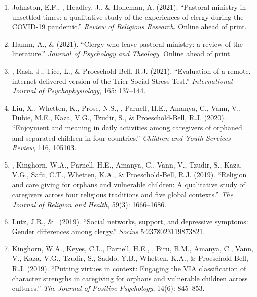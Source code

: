 \begin{enumerate}
\item Johnston, E.F., \Eagle, Headley, J., \& Holleman, A. (2021). ``Pastoral ministry in unsettled times: a qualitative study of the experiences of clergy during the COVID-19 pandemic.'' \textit{Review of Religious Research}. Online ahead of print. 

\item Hamm, A., \&  \Eagle \CF \hspace{.01em} (2021). ``Clergy who leave pastoral ministry: a review of the literature.'' \textit{Journal of Psychology and Theology}. Online ahead of print. 

\item \Eagle, Rash, J., Tice, L., \& Proeschold-Bell, R.J. (2021). ``Evaluation of a remote, internet-delivered version of the Trier Social Stress Test.'' \textit{International Journal of Psychophysiology}, 165: 137--144. 

\item Liu, X., Whetten, K., Prose, N.S., \Eagle, Parnell, H.E., Amanya, C., Vann, V., Dubie, M.E., Kaza, V.G., Tzudir, S., \& Proeschold-Bell, R.J. (2020). ``Enjoyment and meaning in daily activities among caregivers of orphaned and separated children in four countries.'' \emph{Children and Youth Services Review}, 116, 105103. 

\item \Eagle, Kinghorn, W.A., Parnell, H.E., Amanya, C., Vann, V., Tzudir, S., Kaza, V.G., Safu, C.T., Whetten, K.A., \& Proeschold-Bell, R.J. (2019). ``Religion and care giving for orphans and vulnerable children: A qualitative study of caregivers across four religious traditions and five global contexts.'' \emph{The Journal of Religion and Health}, 59(3): 1666--1686. 

\item Lutz, J.R., \& \Eagle\CS\ (2019). ``Social networks, support, and depressive symptoms: Gender differences among clergy.'' \emph{Socius} 5:2378023119873821. 

\item Kinghorn, W.A., Keyes, C.L., Parnell, H.E., \Eagle, Biru, B.M., Amanya, C., Vann, V., Kaza, V.G., Tzudir, S., Saddo, Y.B., Whetten, K.A., \& Proeschold-Bell, R.J. (2019). ``Putting virtues in context: Engaging the VIA classification of character strengths in caregiving for orphans and vulnerable children across cultures.'' \emph{The Journal of Positive Psychology}, 14(6): 845--853. 


\end{enumerate}
